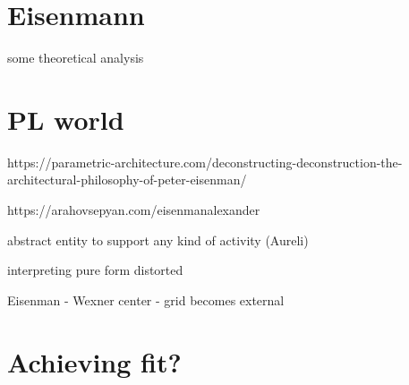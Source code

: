 %
%
%
%
%
%
%
%
%
%
%
%

\section{Eisenmann}

some theoretical analysis

\section{PL world}
https://parametric-architecture.com/deconstructing-deconstruction-the-architectural-philosophy-of-peter-eisenman/

https://arahovsepyan.com/eisenmanalexander

abstract entity to support any kind of activity (Aureli)

interpreting
pure form
distorted

Eisenman - Wexner center - grid becomes external



\section{Achieving fit?}

